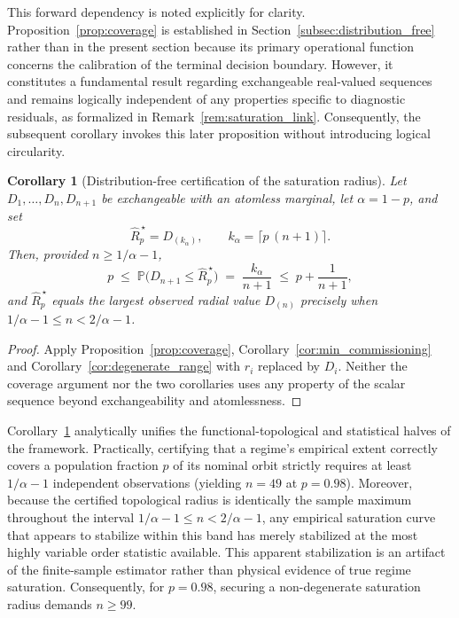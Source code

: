 \documentclass[a4paper]{cas-sc}
\newtheorem{corollary}{Corollary}
\newcommand{\residual}{\ensuremath{r}}
\newcommand{\Prob}{\ensuremath{\mathbb{P}}}
\begin{document}
This forward dependency is noted explicitly for clarity. Proposition~\ref{prop:coverage} is established in Section~\ref{subsec:distribution_free} rather than in the present section because its primary operational function concerns the calibration of the terminal decision boundary. However, it constitutes a fundamental result regarding exchangeable real-valued sequences and remains logically independent of any properties specific to diagnostic residuals, as formalized in Remark~\ref{rem:saturation_link}. Consequently, the subsequent corollary invokes this later proposition without introducing logical circularity.

\begin{corollary}[Distribution-free certification of the saturation radius]
\label{cor:saturation_certification}
Let \(D_1,\ldots,D_n,D_{n+1}\) be exchangeable with an atomless marginal, let
\(\alpha=1-p\), and set
\begin{equation}
\widehat R^{\,\star}_p = D_{(k_\alpha)},
\qquad k_\alpha = \bigl\lceil p\,(n+1) \bigr\rceil .
\label{eq:radius_order_statistic}
\end{equation}
Then, provided \(n\ge 1/\alpha-1\),
\begin{equation}
p \;\le\; \Prob\bigl(D_{n+1}\le \widehat R^{\,\star}_p\bigr)
  \;=\; \frac{k_\alpha}{n+1}
  \;\le\; p+\frac{1}{n+1},
\label{eq:radius_coverage}
\end{equation}
and \(\widehat R^{\,\star}_p\) equals the largest observed radial value
\(D_{(n)}\) precisely when \(1/\alpha-1\le n<2/\alpha-1\).
\end{corollary}

\begin{proof}
Apply Proposition~\ref{prop:coverage}, Corollary~\ref{cor:min_commissioning}
and Corollary~\ref{cor:degenerate_range} with \(\residual_i\) replaced by
\(D_i\). Neither the coverage argument nor the two corollaries uses any
property of the scalar sequence beyond exchangeability and atomlessness.
\end{proof}

Corollary~\ref{cor:saturation_certification} analytically unifies the functional-topological and statistical halves of the framework. Practically, certifying that a regime's empirical extent correctly covers a population fraction \(p\) of its nominal orbit strictly requires at least \(1/\alpha-1\) independent observations (yielding \(n=49\) at \(p=0.98\)). Moreover, because the certified topological radius is identically the sample maximum throughout the interval \(1/\alpha-1\le n<2/\alpha-1\), any empirical saturation curve that appears to stabilize within this band has merely stabilized at the most highly variable order statistic available. This apparent stabilization is an artifact of the finite-sample estimator rather than physical evidence of true regime saturation. Consequently, for \(p=0.98\), securing a non-degenerate saturation radius demands \(n\ge 99\).
\end{document}
